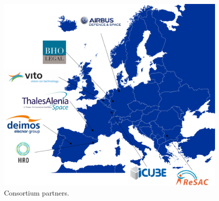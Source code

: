 \begin{figure}[H]
\centering
\includegraphics[width=\textwidth]{images/consortium.png} 
\caption{Consortium partners.}
\label{consortium}
\end{figure}